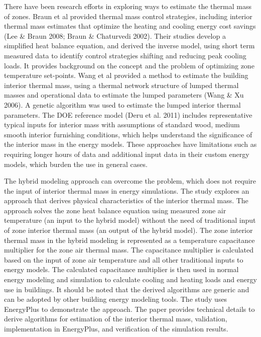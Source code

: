 There have been research efforts in exploring ways to estimate the thermal mass of zones. Braun et al provided thermal mass control strategies, including interior thermal mass estimates that optimize the heating and cooling energy cost savings (Lee \& Braun 2008; Braun \& Chaturvedi 2002). Their studies develop a simplified heat balance equation, and derived the inverse model, using short term measured data to identify control strategies shifting and reducing peak cooling loads. It provides background on the concept and the problem of optimizing zone temperature set-points. Wang et al provided a method to estimate the building interior thermal mass, using a thermal network structure of lumped thermal masses and operational data to estimate the lumped parameters (Wang \& Xu 2006). A genetic algorithm was used to estimate the lumped interior thermal parameters. The DOE reference model (Deru et al. 2011) includes representative typical inputs for interior mass with assumptions of standard wood, medium smooth interior furnishing conditions, which helps understand the significance of the interior mass in the energy models. These approaches have limitations such as requiring longer hours of data and additional input data in their custom energy models, which burden the use in general cases.

The hybrid modeling approach can overcome the problem, which does not require the input of interior thermal mass in energy simulations. The study explores an approach that derives physical characteristics of the interior thermal mass. The approach solves the zone heat balance equation using measured zone air temperature (an input to the hybrid model) without the need of traditional input of zone interior thermal mass (an output of the hybrid model). The zone interior thermal mass in the hybrid modeling is represented as a temperature capacitance multiplier for the zone air thermal mass. The capacitance multiplier is calculated based on the input of zone air temperature and all other traditional inputs to energy models. The calculated capacitance multiplier is then used in normal energy modeling and simulation to calculate cooling and heating loads and energy use in buildings. It should be noted that the derived algorithms are generic and can be adopted by other building energy modeling tools. The study uses EnergyPlus to demonstrate the approach. The paper provides technical details to derive algorithms for estimation of the interior thermal mass, validation, implementation in EnergyPlus, and verification of the simulation results.

